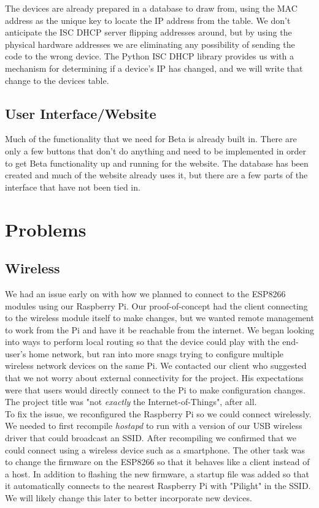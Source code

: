 \documentclass[oneside,openright]{book}
\begin{document}
The devices are already prepared in a database to draw from, using the MAC address as the unique key to locate the IP address from the table. We don't anticipate the ISC DHCP server flipping addresses around, but by using the physical hardware addresses we are eliminating any possibility of sending the code to the wrong device. The Python ISC DHCP library provides us with a mechanism for determining if a device's IP has changed, and we will write that change to the devices table.

\subsection{User Interface/Website}
Much of the functionality that we need for Beta is already built in. There are only a few buttons that don't do anything and need to be implemented in order to get Beta functionality up and running for the website. The database has been created and much of the website already uses it, but there are a few parts of the interface that have not been tied in. 

\section{Problems}
\subsection{Wireless}
We had an issue early on with how we planned to connect to the ESP8266 modules using our Raspberry Pi. Our proof-of-concept had the client connecting to the wireless module itself to make changes, but we wanted remote management to work from the Pi and have it be reachable from the internet. We began looking into ways to perform local routing so that the device could play with the end-user's home network, but ran into more snags trying to configure multiple wireless network devices on the same Pi. We contacted our client who suggested that we not worry about external connectivity for the project. His expectations were that users would directly connect to the Pi to make configuration changes. The project title was "not \textit{exactly} the Internet-of-Things", after all.\\

To fix the issue, we reconfigured the Raspberry Pi so we could connect wirelessly. We needed to first recompile \textit{hostapd} to run with a version of our USB wireless driver that could broadcast an SSID. After recompiling we confirmed that we could connect using a wireless device such as a smartphone. The other task was to change the firmware on the ESP8266 so that it behaves like a client instead of a host. In addition to flashing the new firmware, a startup file was added so that it automatically connects to the nearest Raspberry Pi with "Pilight" in the SSID. We will likely change this later to better incorporate new devices.
\end{document}
